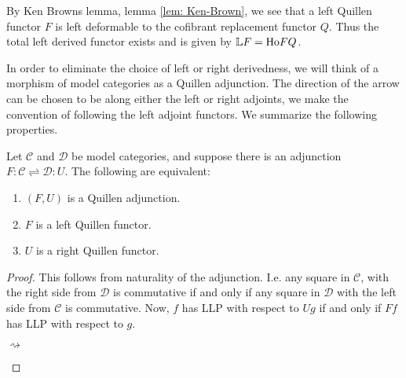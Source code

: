 \documentclass[../thesis.tex]{subfiles}
\begin{document}
            \begin{remark}
                By Ken Browns lemma, lemma \ref{lem: Ken-Brown}, we see that a left Quillen functor $F$ is left deformable to the cofibrant replacement functor $Q$. Thus the total left derived functor exists and is given by $\mathbb{L}F = \tt{Ho} FQ$.
            \end{remark}

            In order to eliminate the choice of left or right derivedness, we will think of a morphism of model categories as a Quillen adjunction. The direction of the arrow can be chosen to be along either the left or right adjoints, we make the convention of following the left adjoint functors. We summarize the following properties.

            \begin{lemma}\label{lem: Quill-adj}
                Let $\mathcal{C}$ and $\mathcal{D}$ be model categories, and suppose there is an adjunction $F:\mathcal{C}\rightleftharpoons\mathcal{D}:U$. The following are equivalent:
                \begin{enumerate}
                    \item $(F,U)$ is a Quillen adjunction.
                    \item $F$ is a left Quillen functor.
                    \item $U$ is a right Quillen functor.
                \end{enumerate}
            \end{lemma}

            \begin{proof}
                This follows from naturality of the adjunction. I.e. any square in $\mathcal{C}$, with the right side from $\mathcal{D}$ is commutative if and only if any square in $\mathcal{D}$ with the left side from $\mathcal{C}$ is commutative. Now, $f$ has LLP with respect to $Ug$ if and only if $Ff$ has LLP with respect to $g$.
                \begin{center}
                     $\rightsquigarrow$
                \end{center} 
            \end{proof}
\end{document}
